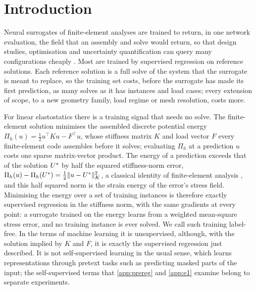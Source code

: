 \section{Introduction}\label{sec:intro}

Neural surrogates of finite-element analyses are trained to return, in one network
evaluation, the field that an assembly and solve would return, so that design studies,
optimisation and uncertainty quantification can query many configurations cheaply
\cite{Pfaff2021,Lu2021DeepONet,Li2021FNO,He2024GeomDeepONet,Zeng2025PCNO,Liu2026GINOT}.
Most are trained by supervised regression on reference solutions. Each reference
solution is a full solve of the system that the surrogate is meant to replace, so the
training set costs, before the surrogate has made its first prediction, as many solves as
it has instances and load cases; every extension of scope, to a new geometry family, load
regime or mesh resolution, costs more.

For linear elastostatics there is a training signal that needs no solve. The
finite-element solution minimises the assembled discrete potential energy
$\Pi_h(u)=\tfrac12u^{\top}Ku-F^{\top}u$, whose stiffness matrix $K$ and load vector $F$
every finite-element code assembles before it solves; evaluating $\Pi_h$ at a prediction
$u$ costs one sparse matrix-vector product. The energy of a prediction exceeds that of
the solution $U^{\ast}$ by half the squared stiffness-norm error,
$\Pi_h(u)-\Pi_h(U^{\ast})=\tfrac12\lVert u-U^{\ast}\rVert_K^2$, a classical identity of
finite-element analysis \cite{Ciarlet1978}, and this half squared norm is the strain energy
of the error's stress field. Minimising the energy over a set of training instances is
therefore exactly supervised regression in the stiffness norm, with the same gradients at
every point: a surrogate trained on the energy learns from a weighted mean-square stress
error, and no training instance is ever solved. We call such training label-free. In the
terms of machine learning it is unsupervised, although, with the solution implied by $K$ and
$F$, it is exactly the supervised regression just described. It is
not self-supervised learning in the usual sense, which learns representations through
pretext tasks such as predicting masked parts of the input; the self-supervised terms that
\ref{app:prereg} and \ref{app:e1} examine belong to separate experiments.

